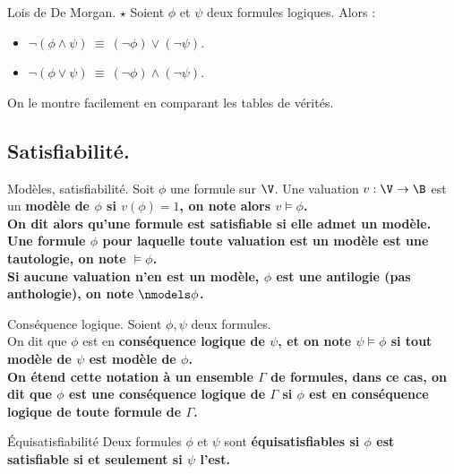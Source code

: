 \documentclass[french, 11pt]{article}
\begin{document}
\begin{prop}{Lois de De Morgan. $\star$}{}
    Soient $\phi$ et $\psi$ deux formules logiques. Alors :
    \begin{itemize}[label=$\hra$]
        \item $\lnot(\phi\land\psi) ~ \equiv ~ (\lnot\phi)\lor(\lnot\psi)$.
        \item $\lnot(\phi\lor\psi) ~ \equiv ~ (\lnot\phi)\land(\lnot\psi)$.
    \end{itemize}
    \tcblower
    On le montre facilement en comparant les tables de vérités.
\end{prop}

\vspace*{-0.5cm}

\subsection{Satisfiabilité.}

\begin{defi}{Modèles, satisfiabilité.}{}
    Soit $\phi$ une formule sur $\V$. Une valuation $v:\V\to\B$ est un \bf{modèle} de $\phi$ si $v(\phi)=1$, on note alors $v\models\phi$.\\
    On dit alors qu'une formule est \bf{satisfiable} si elle admet un modèle.\n
    Une formule $\phi$ pour laquelle toute valuation est un modèle est une tautologie, on note $\models\phi$.\\
    Si aucune valuation n'en est un modèle, $\phi$ est une antilogie (pas anthologie), on note $\nmodels\phi$.
\end{defi}

\vspace*{-0.5cm}

\begin{defi}{Conséquence logique.}{}
    Soient $\phi,\psi$ deux formules.\\
    On dit que $\phi$ est en \bf{conséquence logique} de $\psi$, et on note $\psi\models\phi$ si tout modèle de $\psi$ est modèle de $\phi$.\\
    On étend cette notation à un ensemble $\Gamma$ de formules, dans ce cas, on dit que $\phi$ est une \bf{conséquence logique} de $\Gamma$ si $\phi$ est en \bf{conséquence logique} de toute formule de $\Gamma$.
\end{defi}

\vspace*{-0.5cm}

\begin{defi}{Équisatisfiabilité}{}
    Deux formules $\phi$ et $\psi$ sont \bf{équisatisfiables} si $\phi$ est satisfiable si et seulement si $\psi$ l'est.
\end{defi}
\end{document}
